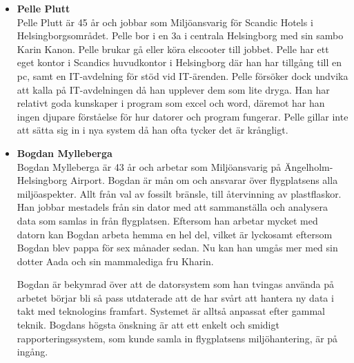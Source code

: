 \documentclass[12pt]{article}
\begin{document}
\begin{itemize}
\begin{itemize}
            \item [] \textbf{Pelle Plutt}
            \\
            Pelle Plutt är 45 år och jobbar som Miljöansvarig för Scandic Hotels i Helsingborgsområdet. Pelle bor i en 3a i centrala Helsingborg med sin sambo Karin Kanon. Pelle brukar gå eller köra elscooter till jobbet. Pelle har ett eget kontor i Scandics huvudkontor i Helsingborg där han har tillgång till en pc, samt en IT-avdelning för stöd vid IT-ärenden. Pelle försöker dock undvika att kalla på IT-avdelningen då han upplever dem som lite dryga. Han har relativt goda kunskaper i program som excel och word, däremot har han ingen djupare förståelse för hur datorer och program fungerar. Pelle gillar inte att sätta sig in i nya system då han ofta tycker det är krångligt.
            
             \item [] \textbf{Bogdan Mylleberga}
            \\
            Bogdan Mylleberga är 43 år och arbetar som Miljöansvarig på Ängelholm-Helsingborg Airport. Bogdan är mån om och ansvarar över flygplatsens alla miljöaspekter. Allt från val av fossilt bränsle, till återvinning av plastflaskor. Han jobbar mestadels från sin dator med att sammanställa och analysera data som samlas in från flygplatsen. Eftersom han arbetar mycket med datorn kan Bogdan arbeta hemma en hel del, vilket är lyckosamt eftersom Bogdan blev pappa för sex månader sedan. Nu kan han umgås mer med sin dotter Aada och sin mammalediga fru Kharin.

            Bogdan är bekymrad över att de datorsystem som han tvingas använda på arbetet börjar bli så pass utdaterade att de har svårt att hantera ny data i takt med teknologins framfart. Systemet är alltså anpassat efter gammal teknik. Bogdans högsta önskning är att ett enkelt och smidigt rapporteringssystem, som kunde samla in flygplatsens miljöhantering, är på ingång.

        \end{itemize}
        \end{itemize}
        
        \newpage
\end{document}
